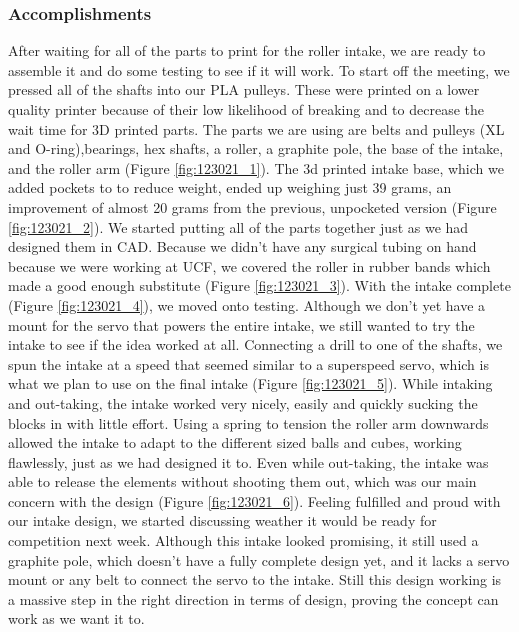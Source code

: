 \subsubsection*{Accomplishments}
After waiting for all of the parts to print for the roller intake, we are ready to assemble it and do some testing to see if it will work. To start off the meeting, we pressed all of the shafts into our PLA pulleys. These were printed on a lower quality printer because of their low likelihood of breaking and to decrease the wait time for 3D printed parts. The parts we are using are belts and pulleys (XL and O-ring),bearings, hex shafts, a roller, a graphite pole, the base of the intake, and the roller arm (Figure \ref{fig:123021_1}). The 3d printed intake base, which we added pockets to to reduce weight, ended up weighing just 39 grams, an improvement of almost 20 grams from the previous, unpocketed version (Figure \ref{fig:123021_2}). We started putting all of the parts together just as we had designed them in CAD. Because we didn’t have any surgical tubing on hand because we were working at UCF, we covered the roller in rubber bands which made a good enough substitute (Figure \ref{fig:123021_3}). 
With the intake complete (Figure \ref{fig:123021_4}), we moved onto testing. Although we don't yet have a mount for the servo that powers the entire intake, we still wanted to try the intake to see if the idea worked at all. Connecting a drill to one of the shafts, we spun the intake at a speed that seemed similar to a superspeed servo, which is what we plan to use on the final intake (Figure \ref{fig:123021_5}). While intaking and out-taking, the intake worked very nicely, easily and quickly sucking the blocks in with little effort. Using a spring to tension the roller arm downwards allowed the intake to adapt to the different sized balls and cubes, working flawlessly, just as we had designed it to. Even while out-taking, the intake was able to release the elements without shooting them out, which was our main concern with the design (Figure \ref{fig:123021_6}). Feeling fulfilled and proud with our intake design, we started discussing weather it would be ready for competition next week. Although this intake looked promising, it still used a graphite pole, which doesn't have a fully complete design yet, and it lacks a servo mount or any belt to connect the servo to the intake. Still this design working is a massive step in the right direction in terms of design, proving the concept can work as we want it to.
 

